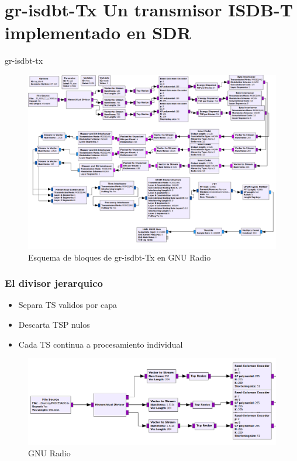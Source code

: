 \section{gr-isdbt-Tx Un transmisor ISDB-T implementado en SDR}

\begin{frame}{gr-isdbt-tx}
\begin{figure}
	\includegraphics[scale=0.20]{flowgraphEdited}
	\caption{Esquema de bloques de gr-isdbt-Tx en GNU Radio}
\end{figure}
\end{frame}

\begin{frame}
\frametitle{El divisor jerarquico}
	\begin{itemize}	
		\item { Separa TS validos por capa}
		\item {	Descarta TSP nulos }
		\item { Cada TS continua a procesamiento individual }
	\end{itemize}
	\begin{figure}
		\includegraphics[scale=0.25]{h_div}
		\caption{GNU Radio}
	\end{figure}
\end{frame}

